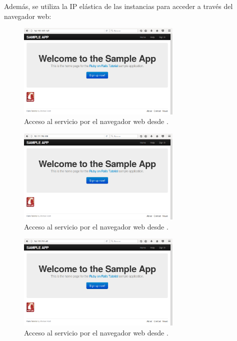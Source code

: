 Además, se utiliza la IP elástica de las instancias para acceder a través del navegador web:

\begin{figure}[H]
\centering
\includegraphics[width=0.7\textwidth]{images/figures/nav-1.png}
\caption{Acceso al servicio por el navegador web desde .\label{fig:figure_placement_example}}
\end{figure}

\begin{figure}[H]
\centering
\includegraphics[width=0.7\textwidth]{images/figures/nav-2.png}
\caption{Acceso al servicio por el navegador web desde .\label{fig:figure_placement_example}}
\end{figure}

\begin{figure}[H]
\centering
\includegraphics[width=0.7\textwidth]{images/figures/nav-3.png}
\caption{Acceso al servicio por el navegador web desde .\label{fig:figure_placement_example}}
\end{figure}

